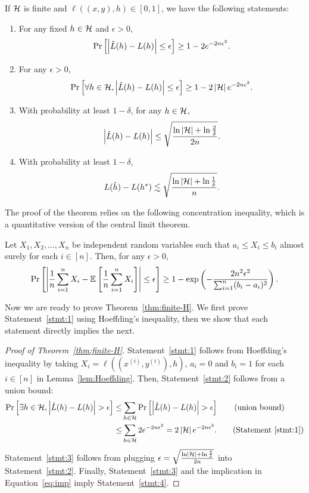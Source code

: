 \documentclass[11pt]{article}
\begin{document}
	\begin{theorem}\label{thm:finite-H}
		If $\mathcal{H}$ is finite and $\ell((x, y), h) \in [0, 1]$, we have the following statements:
		\begin{enumerate}[(1)]
			\item \label{stmt:1} For any fixed $h \in \mathcal{H}$ and $\epsilon > 0$,
				\[\Pr_{}\left[\left|\hat L(h) - L(h)\right| \le \epsilon\right] \ge 1 - 2e^{-2n\epsilon^2}.\]
			\item \label{stmt:2} For any $\epsilon > 0$,
				\[\Pr_{}\left[\forall h \in \mathcal{H},\left|\hat L(h) - L(h)\right| \le \epsilon\right] \ge 1 - 2\left|\mathcal{H}\right|e^{-2n\epsilon^2}.\]
			\item \label{stmt:3} With probability at least $1 - \delta$, for any $h \in \mathcal{H}$,
				\[\left|\hat L(h) - L(h)\right| \le \sqrt{\frac{\ln|\mathcal{H}| + \ln\frac{2}{\delta}}{2n}}.\]
			\item \label{stmt:4} With probability at least $1 - \delta$,
				\[L(\hat h) - L(h^*) \lesssim \sqrt{\frac{\ln|\mathcal{H}| + \ln\frac{1}{\delta}}{n}}.\]
		\end{enumerate}
	\end{theorem}

	The proof of the theorem relies on the following concentration inequality, which is a quantitative version of the central limit theorem.

	\begin{lemma}\label{lem:Hoeffding}
		Let $X_1, X_2, \ldots, X_n$ be independent random variables such that $a_i \le X_i \le b_i$ almost surely for each $i \in [n]$. Then, for any $\epsilon > 0$,
			\[\Pr_{}\left[\left|\frac{1}{n}\sum_{i=1}^{n}X_i - \mathbb{E}_{}\left[\frac{1}{n}\sum_{i=1}^{n}X_i\right]\right| \le \epsilon\right] \ge 1 - \exp\left(-\frac{2n^2\epsilon^2}{\sum_{i=1}^{n}(b_i-a_i)^2}\right).\]
	\end{lemma}

	Now we are ready to prove Theorem~\ref{thm:finite-H}. We first prove Statement~\eqref{stmt:1} using Hoeffding's inequality, then we show that each statement directly implies the next.

	\begin{proof}[Proof of Theorem~\ref{thm:finite-H}]
		Statement~\eqref{stmt:1} follows from Hoeffding's inequality by taking $X_i = \ell((x^{(i)}, y^{(i)}), h)$, $a_i = 0$ and $b_i = 1$ for each $i \in [n]$ in Lemma~\ref{lem:Hoeffding}.
		Then, Statement~\eqref{stmt:2} follows from a union bound:
		\begin{align*}
			\pr{}{\exists h \in \H, \left|\hat L(h) - L(h)\right| > \epsilon}
		\le	&\sum_{h \in \H}\pr{}{\left|\hat L(h) - L(h)\right| > \epsilon}\tag{union bound}\\
		\le	&\sum_{h \in \H}2e^{-2n\epsilon^2}
		=	2\left|\H\right|e^{-2n\epsilon^2}.\tag{Statement~\eqref{stmt:1}}\\
		\end{align*}
		Statement~\eqref{stmt:3} follows from plugging
			$\epsilon = \sqrt{\frac{\ln\left|\mathcal{H}\right|+\ln\frac{2}{\delta}}{2n}}$
		into Statement~\eqref{stmt:2}.
		Finally, Statement~\eqref{stmt:3} and the implication in Equation~\eqref{eq:imp} imply Statement~\eqref{stmt:4}.
	\end{proof}
\end{document}
